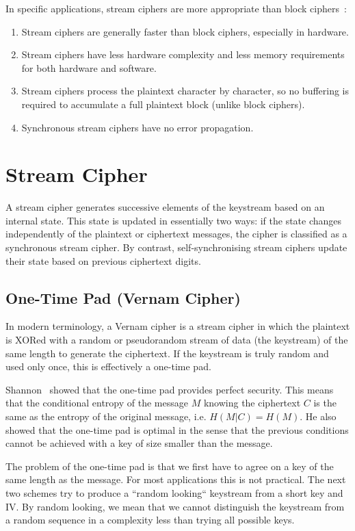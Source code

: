 In specific applications, stream ciphers are more appropriate than block ciphers~\cite{Preneel03nessied20,Robshaw95streamciphers}:
\begin{enumerate}
\item Stream ciphers are generally faster than block ciphers, especially in hardware.
\item Stream ciphers have less hardware complexity and less memory requirements for both hardware and software.
\item Stream ciphers process the plaintext character by character, so no buffering is required to accumulate a full plaintext block (unlike block ciphers).
\item Synchronous stream ciphers have no error propagation.
\end{enumerate}

\section{Stream Cipher}
A stream cipher generates successive elements of the keystream based on an internal state. This state is updated in essentially two ways: if the state changes independently of the plaintext or ciphertext messages, the cipher is classified as a synchronous stream cipher. By contrast, self-synchronising stream ciphers update their state based on previous ciphertext digits.

\subsection{One-Time Pad (Vernam Cipher)}
In modern terminology, a Vernam cipher is a stream cipher in which the plaintext is XORed with a random or pseudorandom stream of data (the keystream) of the same length to generate the ciphertext. If the keystream is truly random and used only once, this is effectively a one-time pad. 

Shannon~\cite{shannon-otp} showed that the one-time pad provides perfect security. This means
that the conditional entropy of the message $M$ knowing the ciphertext $C$ is the same as the
entropy of the original message, i.e. $H(M|C) = H(M)$. He also showed that the one-time
pad is optimal in the sense that the previous conditions cannot be achieved with a key of
size smaller than the message.

The problem of the one-time pad is that we first have to agree on a key of the same
length as the message. For most applications this is not practical. The next two schemes
try to produce a ``random looking`` keystream from a short key and IV. By random looking,
we mean that we cannot distinguish the keystream from a random sequence in a complexity
less than trying all possible keys.

